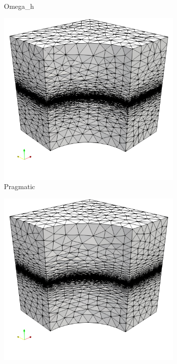 \documentclass[3p,times,procedia,number]{elsarticle}
\begin{document}
\begin{figure}
\begin{subfigure}{.24\textwidth}
\caption{Omega\_h}
\end{subfigure}
\begin{subfigure}{.24\textwidth}
\centering
\includegraphics[width=\textwidth]{pragmatic-cube-cylinder-linear.png}
\caption{Pragmatic}
\end{subfigure}
\begin{subfigure}{.24\textwidth}
\centering
\includegraphics[width=\textwidth]{fefloa-cube-cylinder-linear.png}

\end{subfigure}
\end{figure}
\end{document}
